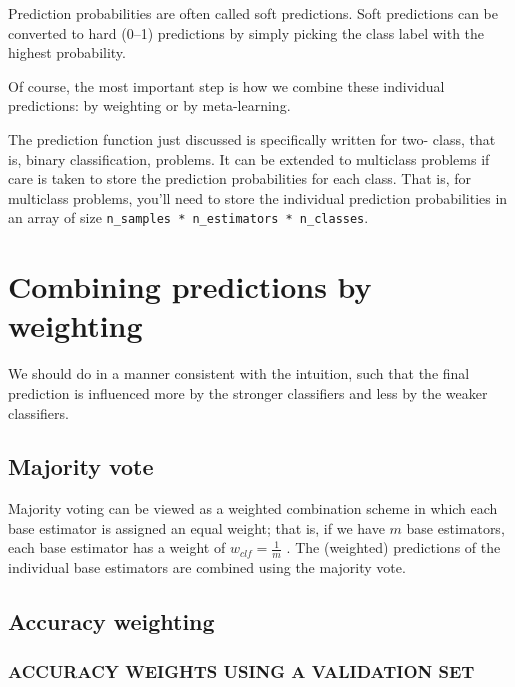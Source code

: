 Prediction probabilities are often called soft predictions. Soft predictions can
be converted to hard (0–1) predictions by simply picking the class label with the highest probability.

Of course, the most important step is how we
combine these individual predictions: by weighting or by meta-learning.

\begin{tcolorbox}[title=CAUTION]
    The prediction function just discussed is specifically written for two-
    class, that is, binary classification, problems. It can be extended to multiclass
    problems if care is taken to store the prediction probabilities for each class.
    That is, for multiclass problems, you’ll need to store the individual prediction
    probabilities in an array of size \verb|n_samples * n_estimators * n_classes|.
\end{tcolorbox}

\section{Combining predictions by weighting}
We should do in a manner consistent with the intuition, such that the final prediction is influenced more by the
stronger classifiers and less by the weaker classifiers.

\subsection{Majority vote}
Majority voting can be viewed as a weighted combination scheme in which each
base estimator is assigned an equal weight; that is, if we have $m$ base estimators,
each base estimator has a weight of $w_{clf}=\frac{1}{m}$
. The (weighted) predictions of the individual base estimators are combined using the majority vote.

\subsection{Accuracy weighting}
\subsubsection*{ACCURACY WEIGHTS USING A VALIDATION SET}

